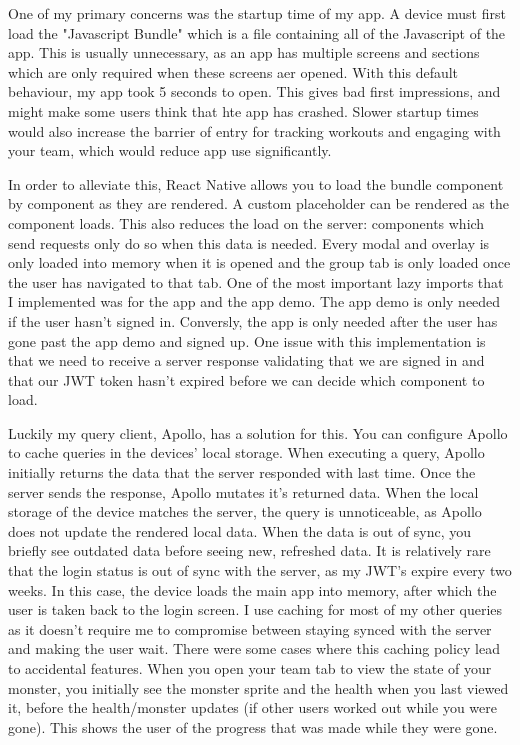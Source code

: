 \documentclass{l4proj}
\begin{document}
One of my primary concerns was the startup time of my app. A device must first load the "Javascript Bundle" which is a file containing all of the Javascript of the app. This is usually unnecessary, as an app has multiple screens and sections which are only required when these screens aer opened. With this default behaviour, my app took 5 seconds to open. This gives bad first impressions, and might make some users think that hte app has crashed. Slower startup times would also increase the barrier of entry for tracking workouts and engaging with your team, which would reduce app use significantly.

In order to alleviate this, React Native allows you to load the bundle component by component as they are rendered. A custom placeholder can be rendered as the component loads. This also reduces the load on the server: components which send requests only do so when this data is needed. Every modal and overlay is only loaded into memory when it is opened and the group tab is only loaded once the user has navigated to that tab. One of the most important lazy imports that I implemented was for the app and the app demo. The app demo is only needed if the user hasn't signed in. Conversly, the app is only needed after the user has gone past the app demo and signed up. One issue with this implementation is that we need to receive a server response validating that we are signed in and that our JWT token hasn't expired before we can decide which component to load. 

Luckily my query client, Apollo, has a solution for this. You can configure Apollo to cache queries in the devices' local storage. When executing a query, Apollo initially returns the data that the server responded with last time. Once the server sends the response, Apollo mutates it's returned data. When the local storage of the device matches the server, the query is unnoticeable, as Apollo does not update the rendered local data. When the data is out of sync, you briefly see outdated data before seeing new, refreshed data. It is relatively rare that the login status is out of sync with the server, as my JWT's expire every two weeks. In this case, the device loads the main app into memory, after which the user is taken back to the login screen. I use caching for most of my other queries as it doesn't require me to compromise between staying synced with the server and making the user wait. There were some cases where this caching policy lead to accidental features. When you open your team tab to view the state of your monster, you initially see the monster sprite and the health when you last viewed it, before the health/monster updates (if other users worked out while you were gone). This shows the user of the progress that was made while they were gone.
\end{document}
